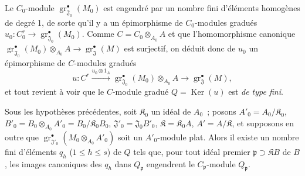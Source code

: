 
Le $C_0$-module $\operatorname{gr}_{\mathfrak J_0}^\bullet(M_0)$ est engendré par
un nombre fini d'éléments homogènes de degré 1, de sorte qu'il y a un
épimorphisme de $C_0$-modules gradués
$u_0:C_0^r\longrightarrow\operatorname{gr}_{\mathfrak J_0}^\bullet(M_0)$.
Comme $C=C_0\otimes_{A_0}A$ et que l'homomorphisme canonique
$\operatorname{gr}_{\mathfrak J_0}^\bullet(M_0)\otimes_{A_0}A
\to\operatorname{gr}_{\mathfrak J}^\bullet(M)$ est surjectif, on déduit donc de
$u_0$ un épimorphisme de $C$-modules gradués
\[
u:C^r\xrightarrow{u_0\otimes1_A}
\operatorname{gr}_{\mathfrak J_0}^\bullet(M_0)\otimes_{A_0}A
\longrightarrow\operatorname{gr}_{\mathfrak J}^\bullet(M),
\]
et tout revient à voir que le $C$-module gradué $Q=\operatorname{Ker}(u)$ est \emph{de type
fini}.

\begin{lemma}[11.2.9.6]
\label{IV.11.2.9.6-fr}
Sous les hypothèses précédentes, soit $\mathfrak K_0$ un idéal de $A_0$~;
posons
$A'_0=A_0/\mathfrak K_0$, $B'_0=B_0\otimes_{A_0}A'_0=B_0/\mathfrak K_0B_0$,
$\mathfrak J'_0=\mathfrak J_0B'_0$, $\mathfrak K=\mathfrak K_0A$, $A'=A/\mathfrak K$, et supposons en outre
que $\operatorname{gr}_{\mathfrak J'_0}^\bullet(M_0\otimes_{A_0}A'_0)$ soit un
$A'_0$-module plat. Alors il existe un nombre fini d'éléments $q_h$
\textup{(}$1\leq h\leq s$\textup{)} de $Q$ tels que, pour tout idéal premier
$\mathfrak p\supset\mathfrak KB$ de $B$, les images canoniques des $q_h$ dans
$Q_\mathfrak p$ engendrent le $C_\mathfrak p$-module $Q_\mathfrak p$.
\end{lemma}

